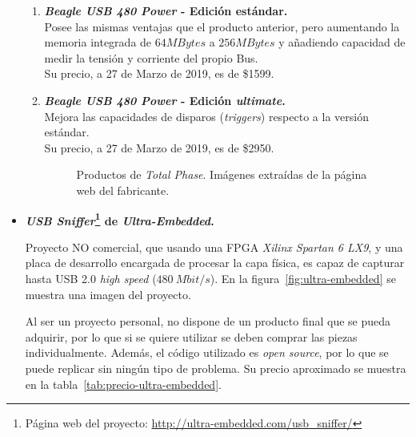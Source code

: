 \begin{itemize}
\begin{enumerate}
        \item \textbf{\emph{Beagle USB 480 Power}\cite{totalphase480-2018} - Edición estándar.} \\
        Posee las mismas ventajas que el producto anterior, pero aumentando la memoria integrada de $64MBytes$ a $256MBytes$ y añadiendo capacidad de medir la tensión y corriente del propio Bus.\\
        Su precio, a 27 de Marzo de 2019, es de \$1599.
        
        \item \textbf{\emph{Beagle USB 480 Power}\cite{totalphase480-2018} - Edición \emph{ultimate}.} \\
        Mejora las capacidades de disparos (\emph{triggers}) respecto a la versión estándar.\\
        Su precio, a 27 de Marzo de 2019, es de \$2950.
    
        \begin{figure}[htbp]
            \centering
            \caption{Productos de \emph{Total Phase}. Imágenes extraídas de la página web del fabricante.} 
            \label{fig:TotalPhase}
        \end{figure}
    \end{enumerate}
    
    \item \textbf{\emph{USB Sniffer}\footnote{Página web del proyecto: \url{http://ultra-embedded.com/usb_sniffer/}} de \emph{Ultra-Embedded}.}

    Proyecto NO comercial, que usando una FPGA \emph{Xilinx Spartan 6 LX9}, y una placa de desarrollo encargada de procesar la capa física, es capaz de capturar hasta USB 2.0 \emph{high speed} ($480~Mbit/s$). En la figura~\ref{fig:ultra-embedded} se muestra una imagen del proyecto.
    
    Al ser un proyecto personal, no dispone de un producto final que se pueda adquirir, por lo que si se quiere utilizar se deben comprar las piezas individualmente. Además, el código utilizado es \emph{open source}, por lo que se puede replicar sin ningún tipo de problema. Su precio aproximado se muestra en la tabla~\ref{tab:precio-ultra-embedded}.


\end{itemize}

